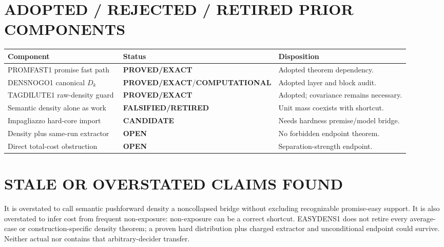 \documentclass[11pt]{article}
\newcommand{\EXACT}{\textbf{PROVED/EXACT}}
\newcommand{\COMP}{\textbf{COMPUTATIONAL}}
\newcommand{\CAND}{\textbf{CANDIDATE}}
\newcommand{\OPEN}{\textbf{OPEN}}
\newcommand{\RET}{\textbf{FALSIFIED/RETIRED}}
\begin{document}
\section{ADOPTED / REJECTED / RETIRED PRIOR COMPONENTS}
\begin{longtable}{p{0.33\linewidth}p{0.20\linewidth}p{0.38\linewidth}}
\toprule Component & Status & Disposition\\ \midrule\endhead
PROMFAST1 promise fast path & \EXACT & Adopted theorem dependency.\\
DENSNOGO1 canonical \(D_k\) & \EXACT/\COMP & Adopted layer and block audit.\\
TAGDILUTE1 raw-density guard & \EXACT & Adopted; covariance remains necessary.\\
Semantic density alone as work & \RET & Unit mass coexists with shortcut.\\
Impagliazzo hard-core import & \CAND & Needs hardness premise/model bridge.\\
Density plus same-run extractor & \OPEN & No forbidden endpoint theorem.\\
Direct total-cost obstruction & \OPEN & Separation-strength endpoint.\\
\bottomrule
\end{longtable}

\section{STALE OR OVERSTATED CLAIMS FOUND}
It is overstated to call semantic pushforward density a noncollapsed bridge
without excluding recognizable promise-easy support. It is also overstated to
infer cost from frequent non-exposure: non-exposure can be a correct shortcut.
EASYDENS1 does not retire every average-case or construction-specific density
theorem; a proven hard distribution plus charged extractor and unconditional
endpoint could survive. Neither actual  nor 
contains that arbitrary-decider transfer.
\end{document}
